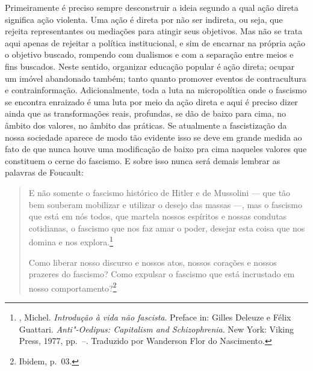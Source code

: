 Primeiramente é preciso sempre desconstruir a ideia segundo a qual ação
direta significa ação violenta. Uma ação é direta por não ser indireta,
ou seja, que rejeita representantes ou mediações para atingir seus
objetivos. Mas não se trata aqui apenas de rejeitar a política
institucional, e sim de encarnar na própria ação o objetivo buscado,
rompendo com dualismos e com a separação entre meios e fins buscados.
Neste sentido, organizar educação popular é ação direta; ocupar um
imóvel abandonado também; tanto quanto promover eventos de contracultura
e contrainformação. Adicionalmente, toda a luta na micropolítica onde o
fascismo se encontra enraizado é uma luta por meio da ação direta e aqui
é preciso dizer ainda que as transformações reais, profundas, se dão de
baixo para cima, no âmbito dos valores, no âmbito das práticas. Se
atualmente a fascistização da nossa sociedade aparece de modo tão
evidente isso se deve em grande medida ao fato de que nunca houve uma
modificação de baixo pra cima naqueles valores que constituem o cerne do
fascismo. E sobre isso nunca será demais lembrar as palavras de
Foucault:

\begin{quote}
E não somente o fascismo histórico de Hitler e de Mussolini --- que tão
bem souberam mobilizar e utilizar o desejo das massas ---, mas o fascismo
que está em nós todos, que martela nossos espíritos e nossas condutas
cotidianas, o fascismo que nos faz amar o poder, desejar esta coisa que
nos domina e nos explora.\footnote{, Michel. \emph{Introdução à
  vida não fascista}. Preface in: Gilles Deleuze e Félix Guattari.
  \emph{Anti"-Oedipus: Capitalism and Schizophrenia}. New York: Viking Press,
  1977, pp.~--. Traduzido por Wanderson Flor do Nascimento.}

Como liberar nosso discurso e nossos atos, nossos corações e nossos
prazeres do fascismo? Como expulsar o fascismo que está incrustado em
nosso comportamento?\footnote{Ibidem, p.~03.}
\end{quote}

